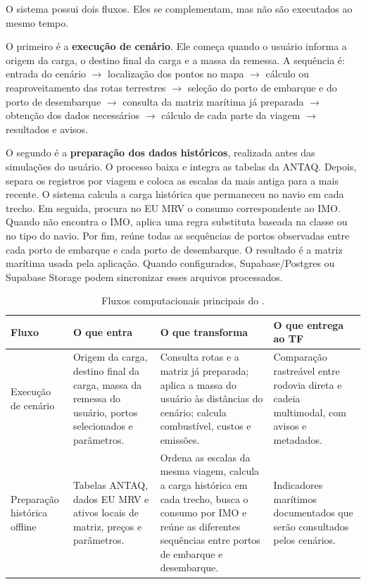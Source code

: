 O sistema possui dois fluxos. Eles se complementam, mas não são executados ao mesmo tempo.

O primeiro é a \textbf{execução de cenário}. Ele começa quando o usuário informa a origem da carga, o destino final da carga e a massa da remessa. A sequência é: entrada do cenário \(\rightarrow\) localização dos pontos no mapa \(\rightarrow\) cálculo ou reaproveitamento das rotas terrestres \(\rightarrow\) seleção do porto de embarque e do porto de desembarque \(\rightarrow\) consulta da matriz marítima já preparada \(\rightarrow\) obtenção dos dados necessários \(\rightarrow\) cálculo de cada parte da viagem \(\rightarrow\) resultados e avisos.

O segundo é a \textbf{preparação dos dados históricos}, realizada antes das simulações do usuário. O processo baixa e integra as tabelas da ANTAQ. Depois, separa os registros por viagem e coloca as escalas da mais antiga para a mais recente. O sistema calcula a carga histórica que permaneceu no navio em cada trecho. Em seguida, procura no EU MRV o consumo correspondente ao IMO. Quando não encontra o IMO, aplica uma regra substituta baseada na classe ou no tipo do navio. Por fim, reúne todas as sequências de portos observadas entre cada porto de embarque e cada porto de desembarque. O resultado é a matriz marítima usada pela aplicação. Quando configurados, Supabase/Postgres ou Supabase Storage podem sincronizar esses arquivos processados.

\begin{table}[htbp]
\centering
\small
\caption{Fluxos computacionais principais do \CabotageLens{}.}
\label{tab:fluxos-computacionais}
\begin{tabularx}{\textwidth}{L{0.22\textwidth}Y Y Y}
\toprule
Fluxo & O que entra & O que transforma & O que entrega ao TF \\
\midrule
Execução de cenário & Origem da carga, destino final da carga, massa da remessa do usuário, portos selecionados e parâmetros. & Consulta rotas e a matriz já preparada; aplica a massa do usuário às distâncias do cenário; calcula combustível, custos e emissões. & Comparação rastreável entre rodovia direta e cadeia multimodal, com avisos e metadados.\\
Preparação histórica offline & Tabelas ANTAQ, dados EU MRV e ativos locais de matriz, preços e parâmetros. & Ordena as escalas da mesma viagem, calcula a carga histórica em cada trecho, busca o consumo por IMO e reúne as diferentes sequências entre portos de embarque e desembarque. & Indicadores marítimos documentados que serão consultados pelos cenários.\\
\bottomrule
\end{tabularx}
\end{table}

